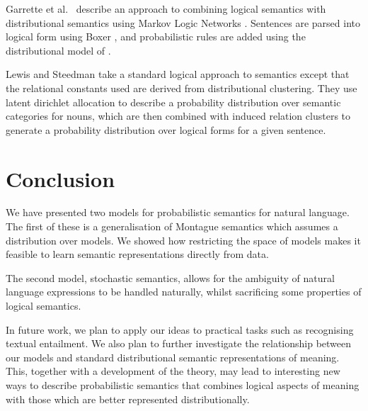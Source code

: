 \documentclass[11pt]{article}
\theoremstyle{definition}
\begin{document}
Garrette et al.~\cite{Garrette:11} describe an approach to combining logical
semantics with distributional semantics using Markov Logic Networks
\cite{Richardson:06}. Sentences are parsed into logical form using
Boxer \cite{Bos:04}, and probabilistic rules are added using the
distributional model of \cite{Erk:10}.

Lewis and Steedman \cite{Lewis:13} take a standard logical approach to
semantics except that the relational constants used are derived from
distributional clustering. They use latent dirichlet allocation to
describe a probability distribution over semantic categories for
nouns, which are then combined with induced relation clusters to
generate a probability distribution over logical forms for a given
sentence.

\section{Conclusion}

We have presented two models for probabilistic semantics for natural
language. The first of these is a generalisation of Montague semantics
which assumes a distribution over models. We showed how restricting
the space of models makes it feasible to learn semantic
representations directly from data.

The second model, stochastic semantics, allows for the ambiguity of
natural language expressions to be handled naturally, whilst
sacrificing some properties of logical semantics.




In future work, we plan to apply our ideas to practical tasks such as
recognising textual entailment.
We also plan to further investigate the relationship between our models and
standard distributional semantic representations of meaning. This,
together with a development of the theory, may lead to interesting
new ways to describe probabilistic semantics that combines logical
aspects of meaning with those which are better represented
distributionally.
\end{document}
